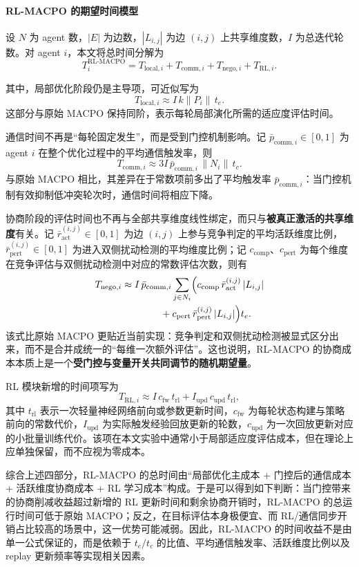 \documentclass[conference]{IEEEtran}
\begin{document}
\paragraph{RL-MACPO 的期望时间模型}
设 $N$ 为 agent 数，$|E|$ 为边数，$|L_{i,j}|$ 为边 $(i,j)$ 上共享维度数，$I$ 为总迭代轮数。对 agent $i$，本文将总时间分解为
\[
T_i^{\mathrm{RL\mbox{-}MACPO}}
=
T_{\mathrm{local},i}
+ 
T_{\mathrm{comm},i}
+ 
T_{\mathrm{nego},i}
+ 
T_{\mathrm{RL},i}.
\]

其中，局部优化阶段仍是主导项，可近似写为
\[
T_{\mathrm{local},i}
\approx
I\,k\lVert P_i\rVert\, t_e.
\]
这部分与原始 MACPO 保持同阶，表示每轮局部演化所需的适应度评估时间。

通信时间不再是“每轮固定发生”，而是受到门控机制影响。记 $\bar p_{\mathrm{comm},i}\in[0,1]$ 为 agent $i$ 在整个优化过程中的平均通信触发率，则
\[
T_{\mathrm{comm},i}
\approx
3I\,\bar p_{\mathrm{comm},i}\,\lVert N_i\rVert\, t_c.
\]
与原始 MACPO 相比，其差异在于常数项前多出了平均触发率 $\bar p_{\mathrm{comm},i}$：当门控机制有效抑制低冲突轮次时，通信时间将相应下降。

协商阶段的评估时间也不再与全部共享维度线性绑定，而只与\textbf{被真正激活的共享维度}有关。记 $\bar r_{\mathrm{act}}^{(i,j)}\in[0,1]$ 为边 $(i,j)$ 上参与竞争判定的平均活跃维度比例，$\bar r_{\mathrm{pert}}^{(i,j)}\in[0,1]$ 为进入双侧扰动检测的平均维度比例；记 $c_{\mathrm{comp}}$、$c_{\mathrm{pert}}$ 为每个维度在竞争评估与双侧扰动检测中对应的常数评估次数，则有
\[
\begin{aligned}
T_{\mathrm{nego},i}
&\approx
I\,\bar p_{\mathrm{comm},i}
\sum_{j\in N_i}
\Bigl(
 c_{\mathrm{comp}}\,\bar r_{\mathrm{act}}^{(i,j)}\,|L_{i,j}| \\
&\qquad\qquad+
 c_{\mathrm{pert}}\,\bar r_{\mathrm{pert}}^{(i,j)}\,|L_{i,j}|
\Bigr)t_e.
\end{aligned}
\]
该式比原始 MACPO 更贴近当前实现：竞争判定和双侧扰动检测被显式区分出来，而不是合并成统一的“每维一次额外评估”。这也说明，RL-MACPO 的协商成本本质上是一个\textbf{受门控与变量开关共同调节的随机期望量}。

RL 模块新增的时间项写为
\[
T_{\mathrm{RL},i}
\approx
I\,c_{\mathrm{fw}}\,t_{\mathrm{rl}}
+ 
I_{\mathrm{upd}}\,c_{\mathrm{upd}}\,t_{\mathrm{rl}},
\]
其中 $t_{\mathrm{rl}}$ 表示一次轻量神经网络前向或参数更新时间，$c_{\mathrm{fw}}$ 为每轮状态构建与策略前向的常数代价，$I_{\mathrm{upd}}$ 为实际触发经验回放更新的轮数，$c_{\mathrm{upd}}$ 为一次回放更新对应的小批量训练代价。该项在本文实验中通常小于局部适应度评估成本，但在理论上应单独保留，而不应视为零成本。

综合上述四部分，RL-MACPO 的总时间由“局部优化主成本 + 门控后的通信成本 + 活跃维度协商成本 + RL 学习成本”构成。于是可以得到如下判断：当门控带来的协商削减收益超过新增的 RL 更新时间和剩余协商开销时，RL-MACPO 的总运行时间可低于原始 MACPO；反之，在目标评估本身极便宜、而 RL/通信同步开销占比较高的场景中，这一优势可能减弱。因此，RL-MACPO 的时间收益不是由单一公式保证的，而是依赖于 $t_e/t_c$ 的比值、平均通信触发率、活跃维度比例以及 replay 更新频率等实现相关因素。
\end{document}
